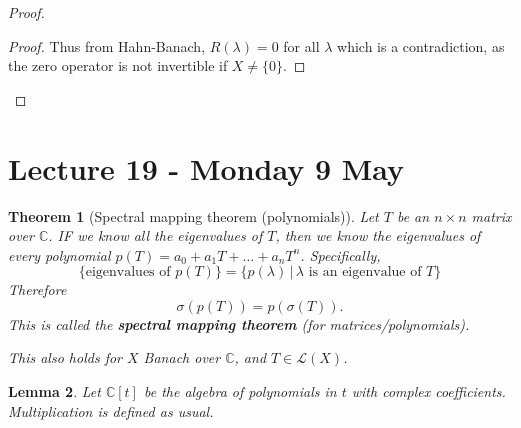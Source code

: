 \documentclass[10pt, oneside, reqno]{amsart}
\theoremstyle{plain}%
\newtheorem{thm}{Theorem}[section]
\newtheorem{lem}[thm]{Lemma}
\theoremstyle{definition}
\theoremstyle{remark}
\newcommand{\given}{ \, | \,}
\newcommand{\Com}{\mathbb{C}}
\begin{document}
\begin{proof}
\begin{proof}
        Thus from Hahn-Banach, $R(\lambda) = 0$ for all $\lambda$ which is a contradiction, as the zero operator is not invertible if $X \neq \{ 0 \}$.   
    \end{proof}
\end{proof}

\section{Lecture 19 - Monday 9 May} %
\label{sec:lecture_19_monday_9_may}
\begin{thm}[Spectral mapping theorem (polynomials)]
    Let $T$ be an $n \times n$ matrix over $\Com$.  IF we know all the eigenvalues of $T$, then we know the eigenvalues of every polynomial $p(T) = a_0 + a_1 T + \dots + a_n T^n$.  Specifically, \[
        \{ \text{eigenvalues of $p(T)$} \} = \{ p(\lambda) \given \text{$\lambda$ is an eigenvalue of $T$} \}
    \] Therefore \[
        \sigma(p(T)) = p(\sigma(T)).
    \]  This is called the \textbf{spectral mapping theorem} (for matrices/polynomials). 
    
    This also holds for $X$ Banach over $\Com$, and $T \in \mathcal L(X)$.
\end{thm}

\begin{lem}
    Let $\Com[t]$ be the algebra of polynomials in $t$ with complex coefficients.  Multiplication is defined as usual.
\end{lem}
\end{document}
